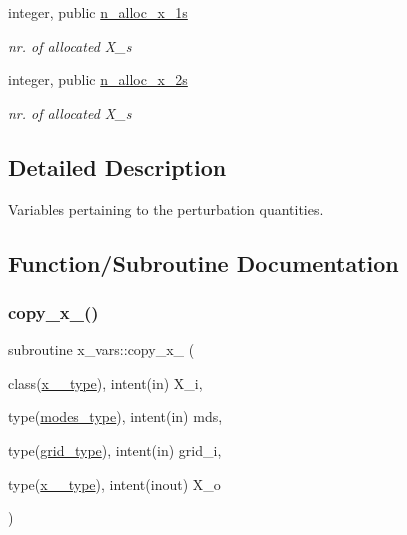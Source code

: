 \begin{DoxyCompactItemize}
integer, public \hyperlink{namespacex__vars_af565ad5c65071b130e69d528aa6faf1d}{n\+\_\+alloc\+\_\+x\+\_\+1s}
\begin{DoxyCompactList}\small\item\em nr. of allocated {\ttfamily X\+\_}\textquotesingle{}s \end{DoxyCompactList}\item 
integer, public \hyperlink{namespacex__vars_add0d925899063fbe0c4ff05d21f35a23}{n\+\_\+alloc\+\_\+x\+\_\+2s}
\begin{DoxyCompactList}\small\item\em nr. of allocated {\ttfamily X\+\_}\textquotesingle{}s \end{DoxyCompactList}\end{DoxyCompactItemize}


\subsection{Detailed Description}
Variables pertaining to the perturbation quantities. 

\subsection{Function/\+Subroutine Documentation}
\mbox{\label{namespacex__vars_ae9744cbf1a4fc06080517a03ac43b960}} 
\subsubsection{\texorpdfstring{copy\+\_\+x\+\_()}{copy\_x\_1()}}
{\footnotesize\ttfamily subroutine x\+\_\+vars\+::copy\+\_\+x\+\_ (\begin{DoxyParamCaption}\item[{class(\hyperlink{structx__vars_1_1x__1__type}{x\+\_\+1\+\_\+type}), intent(in)}]{X\+\_\+i,  }\item[{type(\hyperlink{structx__vars_1_1modes__type}{modes\+\_\+type}), intent(in)}]{mds,  }\item[{type(\hyperlink{structgrid__vars_1_1grid__type}{grid\+\_\+type}), intent(in)}]{grid\+\_\+i,  }\item[{type(\hyperlink{structx__vars_1_1x__1__type}{x\+\_\+1\+\_\+type}), intent(inout)}]{X\+\_\+o }\end{DoxyParamCaption})}



